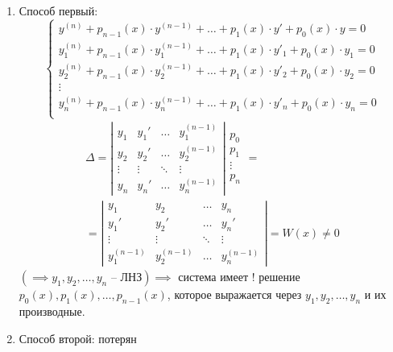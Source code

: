 \begin{note}\leavevmode
    \begin{enumerate}
        \item Способ первый:
              \[
                  \left\{\begin{array}{l}
                      y^{(n)} + p_{n-1}(x)\cdot y^{(n-1)} + \ldots + p_1(x)\cdot y' + p_0(x)\cdot y = 0         \\
                      y^{(n)}_1 + p_{n-1}(x)\cdot y^{(n-1)}_1 + \ldots + p_1(x)\cdot y'_1 + p_0(x)\cdot y_1 = 0 \\
                      y^{(n)}_2 + p_{n-1}(x)\cdot y^{(n-1)}_2 + \ldots + p_1(x)\cdot y'_2 + p_0(x)\cdot y_2 = 0 \\
                      \vdots                                                                                    \\
                      y^{(n)}_n + p_{n-1}(x)\cdot y^{(n-1)}_n + \ldots + p_1(x)\cdot y'_n + p_0(x)\cdot y_n = 0 \\
                  \end{array}\right.
              \]
              \begin{multline*}
                  \Delta = \left|\begin{array}{cccc}
                      y_1    & y_1'   & \ldots & y_1^{(n-1)} \\
                      y_2    & y_2'   & \ldots & y_2^{(n-1)} \\
                      \vdots & \vdots & \ddots & \vdots      \\
                      y_n    & y_n'   & \ldots & y_n^{(n-1)}
                  \end{array}\right|\begin{array}{l}
                      p_0 \\ p_1 \\ \vdots \\ p_n
                  \end{array} = \\
                  = \left|\begin{array}{cccc}
                      y_1         & y_2         & \ldots & y_n         \\
                      y_1'        & y_2'        & \ldots & y_n'        \\
                      \vdots      & \vdots      & \ddots & \vdots      \\
                      y_1^{(n-1)} & y_2^{(n-1)} & \ldots & y_n^{(n-1)}
                  \end{array}\right| = W(x) \ne 0
              \end{multline*}
              $(\implies y_1,y_2,\ldots,y_n\text{ -- ЛНЗ}) \implies$ система имеет $!$ решение \\ $p_0(x),p_1(x),\ldots,p_{n-1}(x)$, которое выражается через $y_1,y_2,\ldots,y_n$ и их производные.

        \item Способ второй: потерян
    \end{enumerate}
\end{note}

